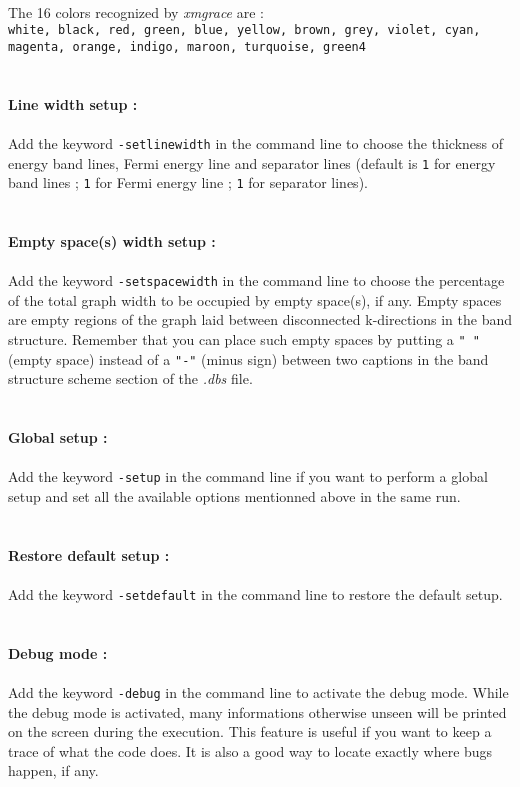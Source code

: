 \documentclass{article}
\begin{document}
\\
The 16 colors recognized by \textit{xmgrace} are : \\
\texttt{white, black, red, green, blue, yellow, brown, grey, violet, cyan, magenta, orange, indigo, maroon, turquoise, green4} \\
\\
\\
{\Large\textbf{Line width setup :}} \\
\\
Add the keyword \texttt{-setlinewidth} in the command line to choose the thickness of energy band lines, Fermi energy line and separator lines (default is \texttt{1} for energy band lines ;  \texttt{1} for Fermi energy line ; \texttt{1} for separator lines). \\
\\
\\
{\Large\textbf{Empty space(s) width setup :}} \\
\\
Add the keyword \texttt{-setspacewidth} in the command line to choose the percentage of the total graph width to be occupied by empty space(s), if any. Empty spaces are empty regions of the graph laid between disconnected k-directions in the band structure. Remember that you can place such empty spaces by putting a \texttt{" "} (empty space) instead of a \texttt{"-"} (minus sign) between two captions in the band structure scheme section of the \textit{.dbs} file. \\
\\
\\
{\Large\textbf{Global setup :}} \\
\\
Add the keyword \texttt{-setup} in the command line if you want to perform a global setup and set all the available options mentionned above in the same run. \\
\\
\\
{\Large\textbf{Restore default setup :}} \\
\\
Add the keyword \texttt{-setdefault} in the command line to restore the default setup.\\
\\
\\
{\Large\textbf{Debug mode :}} \\
\\
Add the keyword \texttt{-debug} in the command line to activate the debug mode. While the debug mode is activated, many informations otherwise unseen will be printed on the screen during the execution. This feature is useful if you want to keep a trace of what the code does. It is also a good way to locate exactly where bugs happen, if any.
\end{document}
